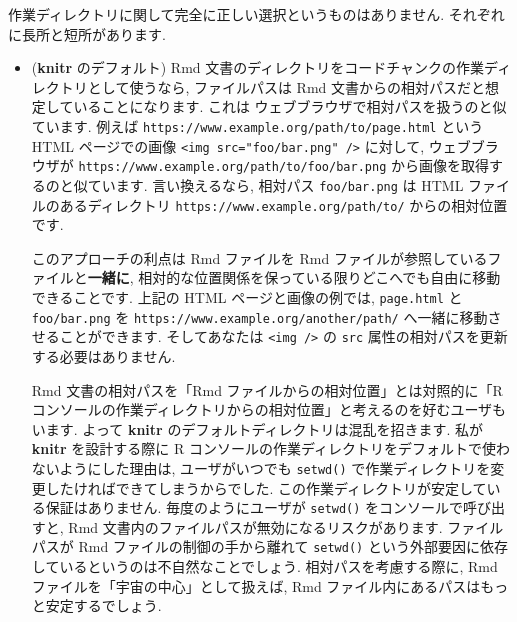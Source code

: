 \documentclass[
  11pt,
  lualatex,
  ja=standard]{bxjsreport}
\begin{document}
作業ディレクトリに関して完全に正しい選択というものはありません. それぞれに長所と短所があります.

\begin{itemize}
\item
  (\textbf{knitr} のデフォルト) Rmd 文書のディレクトリをコードチャンクの作業ディレクトリとして使うなら, ファイルパスは Rmd 文書からの相対パスだと想定していることになります. これは ウェブブラウザで相対パスを扱うのと似ています. 例えば \texttt{https://www.example.org/path/to/page.html} という HTML ページでの画像 \texttt{\textless{}img\ src="foo/bar.png"\ /\textgreater{}} に対して, ウェブブラウザが \texttt{https://www.example.org/path/to/foo/bar.png} から画像を取得するのと似ています. 言い換えるなら, 相対パス \texttt{foo/bar.png} は HTML ファイルのあるディレクトリ \texttt{https://www.example.org/path/to/} からの相対位置です.

  このアプローチの利点は Rmd ファイルを Rmd ファイルが参照しているファイルと\textbf{一緒に}, 相対的な位置関係を保っている限りどこへでも自由に移動できることです. 上記の HTML ページと画像の例では, \texttt{page.html} と \texttt{foo/bar.png} を \texttt{https://www.example.org/another/path/} へ一緒に移動させることができます. そしてあなたは \texttt{\textless{}img\ /\textgreater{}} の \texttt{src} 属性の相対パスを更新する必要はありません.

  Rmd 文書の相対パスを「Rmd ファイルからの相対位置」とは対照的に「Rコンソールの作業ディレクトリからの相対位置」と考えるのを好むユーザもいます. よって \textbf{knitr} のデフォルトディレクトリは混乱を招きます. 私が \textbf{knitr} を設計する際に R コンソールの作業ディレクトリをデフォルトで使わないようにした理由は, ユーザがいつでも \texttt{setwd()} で作業ディレクトリを変更したければできてしまうからでした. この作業ディレクトリが安定している保証はありません. 毎度のようにユーザが \texttt{setwd()} をコンソールで呼び出すと, Rmd 文書内のファイルパスが無効になるリスクがあります. ファイルパスが Rmd ファイルの制御の手から離れて \texttt{setwd()} という外部要因に依存しているというのは不自然なことでしょう. 相対パスを考慮する際に, Rmd ファイルを「宇宙の中心」として扱えば, Rmd ファイル内にあるパスはもっと安定するでしょう.


\end{itemize}
\end{document}
